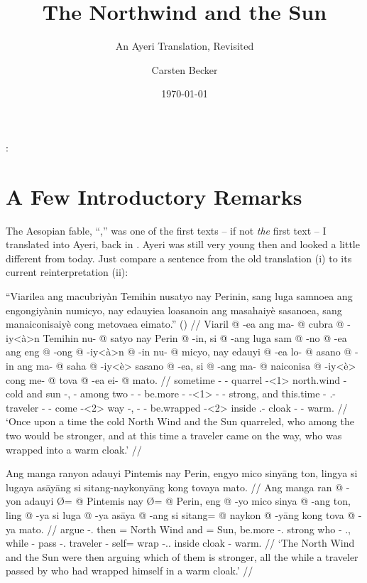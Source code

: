 \documentclass[12pt,paper=a4]{scrartcl}
\author{Carsten Becker}
\title{The Northwind and the Sun}
\subtitle{An Ayeri Translation, Revisited}
\date{\today} %
\newenvironment{mytitle}{
    \hfill
    \begin{minipage}{0.667\textwidth}
	\vspace{\baselineskip}
	\begin{center}
	    \Large
	    \sffamily\bfseries
	    \makeatletter
}{
	    \makeatother
	\end{center}
	\vspace{1em}
    \end{minipage}
    \hfill
}
\begin{document}

\begin{mytitle}
    \@title:\\
    \@subtitle
\end{mytitle}

\section{A Few Introductory Remarks}

The Aesopian fable, \enquote{,} was one of the first texts -- if not \emph{the} first text -- I translated into Ayeri, back in \citeyear{becker2004}. Ayeri was still very young then and looked a little different from today. Just compare a sentence from the old translation (i) to its current reinterpretation (ii):

\ex[exno=i, belowexskip=0em]
\begingl
	\glpreamble \enquote{Viarilea ang macubriyàn Temihin nusatyo nay Perinin, sang luga samnoea ang engongiyànin numicyo, nay edauyiea loasanoin ang masahaiyè sasanoea, sang manaiconisaiyè cong metovaea eimato.} (\cite[1]{becker2004}) //
	\gla Viaril @ -ea ang ma- @ cubra @ -iy<à>n Temihin nu- @ satyo nay Perin @ -in, si @ -ang luga sam @ -no @ -ea ang eng @ -ong @ -iy<à>n @ -in nu- @ micyo, nay edauyi @ -ea lo- @ asano @ -in ang ma- @ saha @ -iy<è> sasano @ -ea, si @ -ang ma- @ naiconisa @ -iy<è> cong me- @ tova @ -ea ei- @ mato. //
	\glb sometime -\Loc{} \AgtT{} \Pst{}- quarrel - north.wind \Aarg{}- cold and sun -\Top{}, \Rel{} -\Aarg{} among two -\Nmlz{} -\Loc{} \AgtT{} be.more -\Irr{} - -\Top{} \Aarg{}- strong, and this.time -\Loc{} \Indf{}.\Aarg{}- traveler -\Top{} \AgtT{} \Pst{}- come - way -\Loc{}, \Rel{} -\Aarg{} \Pst{}- be.wrapped - inside \Indf{}.\Parg{}- cloak -\Loc{} \Obl{}- warm. //
	\glft `Once upon a time the cold North Wind and the Sun quarreled, who among the two would be stronger, and at this time a traveler came on the way, who was wrapped into a warm cloak.' //
\endgl\xe

\ex[exno=ii]
\begingl
	\glpreamble Ang manga ranyon adauyi Pintemis nay Perin, engyo mico sinyāng ton, lingya si lugaya asāyāng si sitang-naykonyāng kong tovaya mato. //
	\gla Ang manga ran @ -yon adauyi Ø= @ Pintemis nay Ø= @ Perin, eng @ -yo mico sinya @ -ang ton, ling @ -ya si luga @ -ya asāya @ -ang si sitang= @ naykon @ -yāng kong tova @ -ya mato. //
	\glb \AgtT{} \Prog{} argue -\Tpl{}.\N{} then \Top{}= {North Wind} and \Top{}= Sun, be.more -\Tsg{}.\N{} strong who -\Aarg{} \Tpl{}.\Gen{}, while -\Loc{} \Rel{} pass -\Tsg{}.\M{} traveler -\Aarg{} \Rel{} self= wrap -\Tsg{}.\M{}.\Aarg{} inside cloak -\Loc{} warm. //
	\glft `The North Wind and the Sun were then arguing which of them is stronger, all the while a traveler passed by who had wrapped himself in a warm cloak.' //
\endgl
\xe
\end{document}
